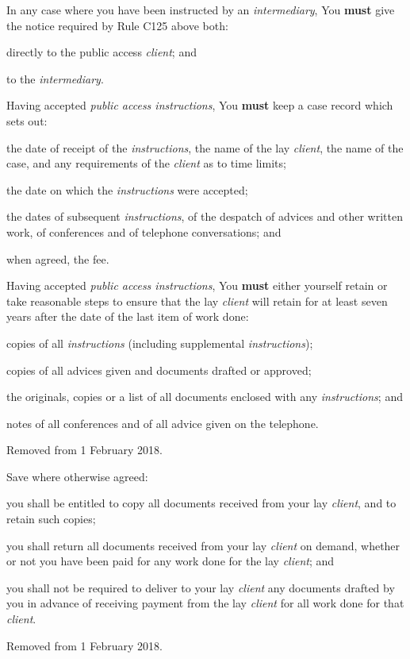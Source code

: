 
In any case where you have been instructed by an \emph{intermediary},
You \textcolor{myred}{\textbf{must}} give the notice required by Rule C125 above both:
\begin{numlist}\item directly to the public access \emph{client}; and
\item to the \emph{intermediary}.
\end{numlist}

Having accepted \emph{public access instructions}, You \textcolor{myred}{\textbf{must}} keep a case
record which sets out:
\begin{numlist}\item the date of receipt of the \emph{instructions}, the name of the lay
\emph{client}, the name of the case, and any requirements of the
\emph{client} as to time limits;
\item the date on which the \emph{instructions} were accepted;
\item the dates of subsequent \emph{instructions}, of the despatch of
advices and other written work, of conferences and of telephone
conversations; and
\item when agreed, the fee.
\end{numlist}

Having accepted \emph{public access instructions}, You \textcolor{myred}{\textbf{must}} either
yourself retain or take reasonable steps to ensure that the lay
\emph{client} will retain for at least seven years after the date of the
last item of work done:
\begin{numlist}\item copies of all \emph{instructions} (including supplemental
\emph{instructions});
\item copies of all advices given and documents drafted or approved;
\item the originals, copies or a list of all documents enclosed with any
\emph{instructions}; and
\item notes of all conferences and of all advice given on the telephone.
\end{numlist}

Removed from 1 February 2018.


Save where otherwise agreed:
\begin{numlist}\item you shall be entitled to copy all documents received from your lay
\emph{client}, and to retain such copies;
\item you shall return all documents received from your lay \emph{client}
on demand, whether or not you have been paid for any work done for the
lay \emph{client}; and
\item you shall not be required to deliver to your lay \emph{client} any
documents drafted by you in advance of receiving payment from the lay
\emph{client} for all work done for that \emph{client}.
\item Removed from 1 February 2018.
\end{numlist}


